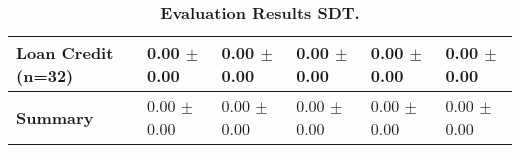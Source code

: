 \begin{table}[htb]
{\begin{tabular}{llllll}
\textbf{Loan Credit (n=32)                       } &  \phantom{0}0.00 $\pm$ \phantom{0}0.00 &             \phantom{0}0.00 $\pm$ \phantom{0}0.00 &  \phantom{0}0.00 $\pm$ \phantom{0}0.00 &  \phantom{0}0.00 $\pm$ \phantom{0}0.00 &  \phantom{0}0.00 $\pm$ \phantom{0}0.00 \\
\midrule
\textbf{Summary                                  } &  \phantom{0}0.00 $\pm$ \phantom{0}0.00 &             \phantom{0}0.00 $\pm$ \phantom{0}0.00 &  \phantom{0}0.00 $\pm$ \phantom{0}0.00 &  \phantom{0}0.00 $\pm$ \phantom{0}0.00 &  \phantom{0}0.00 $\pm$ \phantom{0}0.00 \\
\bottomrule
\end{tabular}%
}
\caption{\textbf{Evaluation Results SDT.}}
\label{tab:eval-results}
\end{table}
\newpage 
